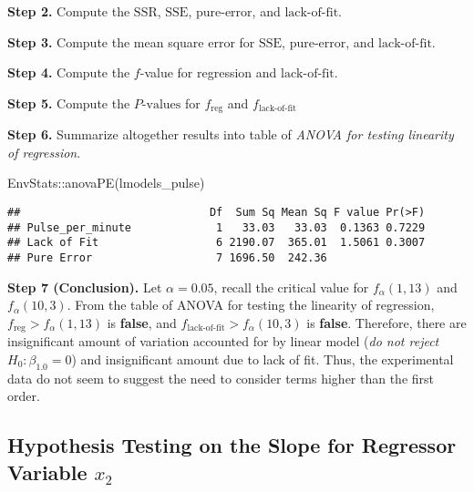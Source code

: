 \documentclass[
]{article}
\newenvironment{Shaded}{\begin{snugshade}}{\end{snugshade}}
\newcommand{\FunctionTok}[1]{\textcolor[rgb]{0.00,0.00,0.00}{#1}}
\newcommand{\NormalTok}[1]{#1}
\newcommand{\SpecialCharTok}[1]{\textcolor[rgb]{0.00,0.00,0.00}{#1}}
\begin{document}
\textbf{Step 2.} Compute the \(\text{SSR}\), \(\text{SSE}\),
\(\text{pure-error}\), and \(\text{lack-of-fit}\).

\textbf{Step 3.} Compute the mean square error for \(\text{SSE}\),
\(\text{pure-error}\), and \(\text{lack-of-fit}\).

\textbf{Step 4.} Compute the \(f\)-value for regression and
\(\text{lack-of-fit}\).

\textbf{Step 5.} Compute the \(P\text{-values}\) for \(f_{\text{reg}}\)
and \(f_{\text{lack-of-fit}}\)

\textbf{Step 6.} Summarize altogether results into table of \emph{ANOVA
for testing linearity of regression}.

\begin{Shaded}
\begin{Highlighting}[]
\NormalTok{EnvStats}\SpecialCharTok{::}\FunctionTok{anovaPE}\NormalTok{(lmodels\_pulse)}
\end{Highlighting}
\end{Shaded}

\begin{verbatim}
##                             Df  Sum Sq Mean Sq F value Pr(>F)
## Pulse_per_minute             1   33.03   33.03  0.1363 0.7229
## Lack of Fit                  6 2190.07  365.01  1.5061 0.3007
## Pure Error                   7 1696.50  242.36
\end{verbatim}

\textbf{Step 7 (Conclusion).} Let \(\alpha = 0.05\), recall the critical
value for \(f_\alpha(1, 13)\) and \(f_\alpha(10, 3)\). From the table of
ANOVA for testing the linearity of regression,
\(f_\text{reg} > f_\alpha(1, 13)\) is \textbf{false}, and
\(f_{\text{lack-of-fit}} > f_\alpha(10, 3)\) is \textbf{false}.
Therefore, there are insignificant amount of variation accounted for by
linear model (\emph{do not reject \(H_0:\beta_{1.0} = 0\)}) and
insignificant amount due to lack of fit. Thus, the experimental data do
not seem to suggest the need to consider terms higher than the first
order.

\hypertarget{hypothesis-testing-on-the-slope-for-regressor-variable-x_2}{%
\subsection{\texorpdfstring{Hypothesis Testing on the Slope for
Regressor Variable
\(x_2\)}{Hypothesis Testing on the Slope for Regressor Variable x\_2}}\label{hypothesis-testing-on-the-slope-for-regressor-variable-x_2}}
\end{document}
